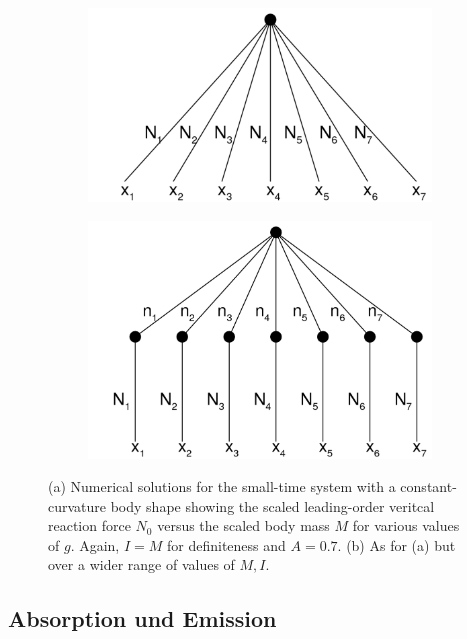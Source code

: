 \begin{figure}
\centering
\begin{subfigure}[a]{0.75\textwidth}
   \includegraphics[width=1\linewidth]{figures/std_wave}
   \caption{}
   \label{fig:Ng1}
\end{subfigure}

\begin{subfigure}[b]{0.55\textwidth}
   \includegraphics[width=1\linewidth]{figures/mctdh_wave1}
   \caption{}
   \label{fig:Ng2}
\end{subfigure}

\caption[Two numerical solutions]{(a) Numerical solutions for the small-time system
with a constant-curvature body shape showing the scaled leading-order veritcal
reaction force $N_0$ versus the scaled body mass $M$ for various values of $g$.
Again, $I=M$ for definiteness and $A=0.7$. (b) As for (a) but over a wider range of
values of $M,I$.}
\end{figure}






\clearpage
 \subsection{Absorption und Emission}
